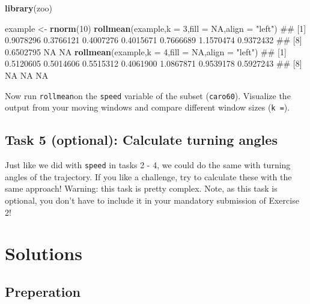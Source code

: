 \documentclass[]{book}
\newenvironment{Shaded}{\begin{snugshade}}{\end{snugshade}}
\newcommand{\KeywordTok}[1]{\textcolor[rgb]{0.13,0.29,0.53}{\textbf{#1}}}
\newcommand{\DataTypeTok}[1]{\textcolor[rgb]{0.13,0.29,0.53}{#1}}
\newcommand{\DecValTok}[1]{\textcolor[rgb]{0.00,0.00,0.81}{#1}}
\newcommand{\StringTok}[1]{\textcolor[rgb]{0.31,0.60,0.02}{#1}}
\newcommand{\OtherTok}[1]{\textcolor[rgb]{0.56,0.35,0.01}{#1}}
\newcommand{\NormalTok}[1]{#1}
\begin{document}
\begin{Shaded}
\begin{Highlighting}[]

\KeywordTok{library}\NormalTok{(zoo)}

\NormalTok{example <-}\StringTok{ }\KeywordTok{rnorm}\NormalTok{(}\DecValTok{10}\NormalTok{)}
\KeywordTok{rollmean}\NormalTok{(example,}\DataTypeTok{k =} \DecValTok{3}\NormalTok{,}\DataTypeTok{fill =} \OtherTok{NA}\NormalTok{,}\DataTypeTok{align =} \StringTok{"left"}\NormalTok{)}
\NormalTok{##  [1] 0.9078296 0.3766121 0.4007276 0.4015671 0.7666689 1.1570474 0.9372432}
\NormalTok{##  [8] 0.6502795        NA        NA}
\KeywordTok{rollmean}\NormalTok{(example,}\DataTypeTok{k =} \DecValTok{4}\NormalTok{,}\DataTypeTok{fill =} \OtherTok{NA}\NormalTok{,}\DataTypeTok{align =} \StringTok{"left"}\NormalTok{)}
\NormalTok{##  [1] 0.5120605 0.5014606 0.5515312 0.4061900 1.0867871 0.9539178 0.5927243}
\NormalTok{##  [8]        NA        NA        NA}
\end{Highlighting}
\end{Shaded}

Now run \texttt{rollmean}on the \texttt{speed} variable of the subset
(\texttt{caro60}). Visualize the output from your moving windows and
compare different window sizes (\texttt{k\ =}).

\subsection{Task 5 (optional): Calculate turning
angles}\label{task-5-optional-calculate-turning-angles}

Just like we did with \texttt{speed} in tasks 2 - 4, we could do the
same with turning angles of the trajectory. If you like a challenge, try
to calculate these with the same approach! Warning: this task is pretty
complex. Note, as this task is optional, you don't have to include it in
your mandatory submission of Exercise 2!

\section{Solutions}\label{solutions-1}

\subsection{Preperation}\label{preperation-2}
\end{document}
